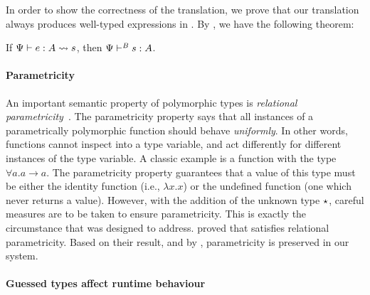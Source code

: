 In order to show the correctness of the translation, we prove that our
translation always produces well-typed expressions in \pbc. By
, we have the following theorem:

\begin{ctheorem}
  \label{lemma:type-safety}
  If $\Psi {} \vdash e : A \rightsquigarrow{s}$, then $\Psi \vdash^{\mathit{B}} s : A$.
\end{ctheorem}

\paragraph{Parametricity} An important semantic property of polymorphic types is
\textit{relational parametricity}~\cite{reynolds1983types}. The parametricity
property says that all instances of a parametrically polymorphic function should
behave \textit{uniformly}. In other words, functions cannot inspect into a type
variable, and act differently for different instances of the type variable. A
classic example is a function with the type $\forall a . a \to a$. The
parametricity property guarantees that a value of this type must be either the
identity function (i.e., $\lambda x . x$) or the undefined function (one which
never returns a value). However, with the addition of the unknown type
$\star$, careful measures are to be taken to ensure parametricity. This is
exactly the circumstance that \pbc was designed to address. \citet{amal2017blame}
proved that \pbc satisfies relational parametricity. Based on their result, and
by , parametricity is preserved in our system.

\paragraph{Guessed types affect runtime behaviour}

